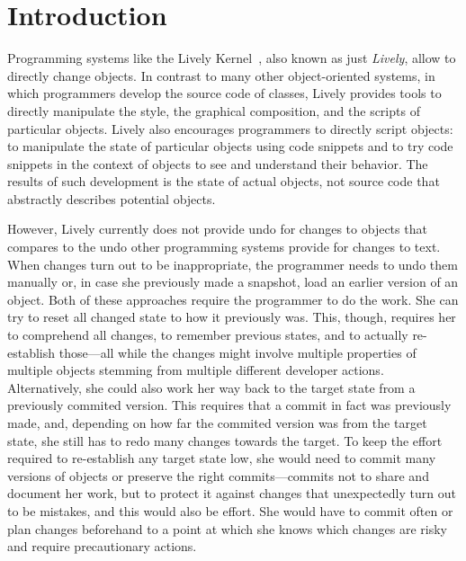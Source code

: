 
\chapter{Introduction} \label{chapter:INTRODUCTION}

Programming systems like the Lively Kernel~\cite{Ingalls2008LKS,Krahn2009LWD}, also known as just \emph{Lively}, allow to directly change objects.
In contrast to many other object-oriented systems, in which programmers develop the source code of classes, Lively provides tools to directly manipulate the style, the graphical composition, and the scripts of particular objects.
Lively also encourages programmers to directly script objects: to manipulate the state of particular objects using code snippets and to try code snippets in the context of objects to see and understand their behavior.
The results of such development is the state of actual objects, not source code that abstractly describes potential objects.

However, Lively currently does not provide undo for changes to objects that compares to the undo other programming systems provide for changes to text.
When changes turn out to be inappropriate, the programmer needs to undo them manually or, in case she previously made a snapshot, load an earlier version of an object.
Both of these approaches require the programmer to do the work.
She can try to reset all changed state to how it previously was.
This, though, requires her to comprehend all changes, to remember previous states, and to actually re-establish those---all while the changes might involve multiple properties of multiple objects stemming from multiple different developer actions.
Alternatively, she could also work her way back to the target state from a previously commited version.
This requires that a commit in fact was previously made, and, depending on how far the commited version was from the target state, she still has to redo many changes towards the target.
To keep the effort required to re-establish any target state low, she would need to commit many versions of objects or preserve the right commits---commits not to share and document her work, but to protect it against changes that unexpectedly turn out to be mistakes, and this would also be effort.
She would have to commit often or plan changes beforehand to a point at which she knows which changes are risky and require precautionary actions.

